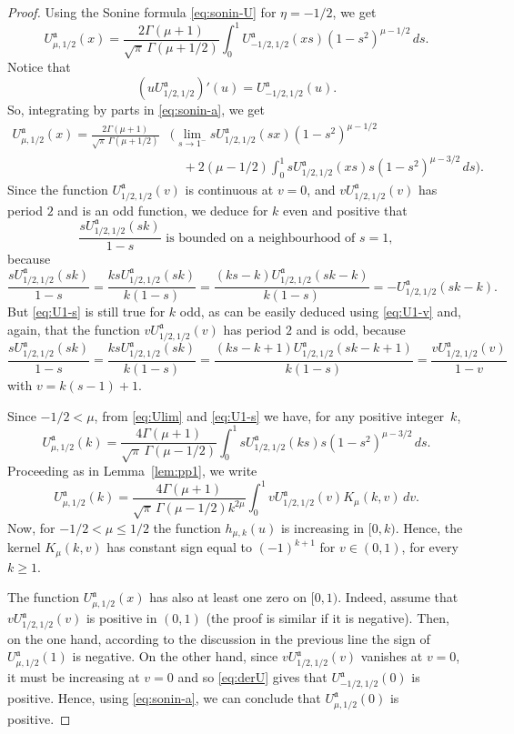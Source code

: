 \documentclass[10pt,a4paper]{article}
\numberwithin{equation}{section}
\theoremstyle{plain}
\theoremstyle{definition}
\newcommand{\aA}{\mathfrak{a}}
\begin{document}
\begin{proof}
Using the Sonine formula \eqref{eq:sonin-U} for $\eta=-1/2$, we get
\begin{equation}
\label{eq:sonin-a}
   U_{\mu,1/2}^{\aA}(x) = \frac{2\Gamma(\mu +1)}{\sqrt{\pi}\,\Gamma(\mu+1/2)}
   \int_0^1U_{-1/2,1/2}^{\aA}(xs) (1-s^2)^{\mu-1/2} \,ds.
\end{equation}
Notice that
\begin{equation}
\label{eq:derU}
   (uU_{1/2,1/2}^{\aA})'(u) = U_{-1/2,1/2}^{\aA}(u).
\end{equation}
So, integrating by parts in \eqref{eq:sonin-a}, we get
\begin{align}
\label{eq:Ulim}
   U_{\mu,1/2}^{\aA}(x) = \frac{2\Gamma(\mu +1)}{\sqrt{\pi}\,\Gamma(\mu+1/2)}
   & \Big( \lim_{s\to 1^-}sU_{1/2,1/2}^{\aA}(sx)(1-s^2)^{\mu-1/2}
   \\
\nonumber
   &\quad + 2(\mu-1/2)
   \int_0^1 sU_{1/2,1/2}^{\aA}(xs)s(1-s^2)^{\mu-3/2}\,ds\Big).
\end{align}
Since the function $U_{1/2,1/2}^{\aA}(v)$ is continuous at $v=0$, and $vU_{1/2,1/2}^{\aA}(v)$ has period $2$ and is an odd function, we deduce for $k$ even and positive that
\begin{equation}
\label{eq:U1-s}
   \frac{sU_{1/2,1/2}^{\aA}(sk)}{1-s} \text{ is bounded on a neighbourhood of }s=1,
\end{equation}
because
\[
   \frac{s U_{1/2,1/2}^{\aA}(sk)}{1-s}
   = \frac{ks U_{1/2,1/2}^{\aA}(s k)}{k(1-s)}
   = \frac{(ks-k) U_{1/2,1/2}^{\aA}(s k-k)}{k(1-s)}
   = -U_{1/2,1/2}^{\aA}(sk-k).
\]
But \eqref{eq:U1-s} is still true for $k$ odd, as can be easily deduced using
\eqref{eq:U1-v} and, again, that the function $vU_{1/2,1/2}^{\aA}(v)$ has period $2$ and is odd,
because
\[
   \frac{s U_{1/2,1/2}^{\aA}(s k)}{1-s} = \frac{ks U_{1/2,1/2}^{\aA}(sk)}{k(1-s)}
   = \frac{(k s-k+1) U_{1/2,1/2}^{\aA}(sk-k+1)}{k(1-s)}
   = \frac{v U_{1/2,1/2}^{\aA}(v)}{1-v}
\]
with $v=k(s-1)+1$.

Since $-1/2<\mu$, from \eqref{eq:Ulim} and \eqref{eq:U1-s} we have,
for any positive integer~$k$,
\[
   U_{\mu,1/2}^{\aA}(k) = \frac{4\Gamma(\mu +1)}{\sqrt{\pi}\,\Gamma(\mu-1/2)}
   \int_0^1sU_{1/2,1/2}^{\aA}(ks)s(1-s^2)^{\mu-3/2}\,ds.
\]
Proceeding as in Lemma~\ref{lem:pp1}, we write
\[
   U_{\mu,1/2}^{\aA}(k) = \frac{4\Gamma(\mu +1)}{\sqrt{\pi}\,\Gamma(\mu-1/2)k^{2\mu}}
   \int_0^1 vU_{1/2,1/2}^{\aA}(v)K_{\mu}(k,v)\,dv.
\]
Now, for $-1/2< \mu\le 1/2$ the function $h_{\mu,k}(u)$ is increasing in $[0,k)$. Hence, the kernel $K_{\mu}(k,v)$ has constant sign equal to $(-1)^{k+1}$ for $v\in(0,1)$, for every $k\ge 1$.

The function $U_{\mu,1/2}^{\aA}(x)$ has also at least one zero on $[0,1)$. Indeed, assume that $vU_{1/2,1/2}^{\aA}(v)$ is positive in $(0,1)$ (the proof is similar if it is negative). Then, on the one hand, according to the discussion in the previous line the sign of $U_{\mu,1/2}^{\aA}(1)$ is negative. On the other hand, since $vU_{1/2,1/2}^{\aA}(v)$ vanishes at $v=0$, it must be increasing at $v=0$ and so \eqref{eq:derU} gives that $U_{-1/2,1/2}^{\aA}(0)$ is positive. Hence, using \eqref{eq:sonin-a}, we can conclude that $U_{\mu,1/2}^{\aA}(0)$ is positive.
\end{proof}
\end{document}
